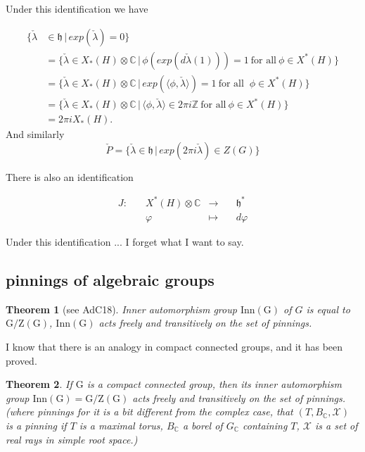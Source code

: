 \documentclass[12pt]{amsart}
\numberwithin{equation}{section}
\newtheorem{thm}{Theorem}[section]
\newcommand{\BC}{{\mathbb {C}}}
\newcommand{\BZ}{{\mathbb {Z}}}
\newcommand{\RG}{{\mathrm {G}}}
\newcommand{\fh}{\mathfrak{h}}
\newcommand{\set}[2]{\{#1\,|\,#2\}}
\newcommand{\defmap}[5]{
           \begin{equation*}
              \begin{aligned}
                   #1:\quad  & #2 &\longrightarrow &\quad #3 \\
                      \quad  & #4    &\longmapsto  &\quad #5
              \end{aligned}
           \end{equation*}
          }
\begin{document}
Under this identification we have

\begin{align*}
  \set{\check{\lambda} & \in \fh}{exp(\check{\lambda})=0}                                                                                                        \\
                       & = \set{\check{\lambda} \in X_*(H)\otimes \BC}{\phi(exp(d \check{\lambda}(1))) = 1 \ \textrm{for all} \ \phi \in X^*(H)}                 \\
                       & = \set{\check{\lambda} \in X_*(H)\otimes \BC}{exp(\langle\phi,\check{\lambda} \rangle) = 1 \ \textrm{for all } \ \phi \in X^*(H)}       \\
                       & = \set{\check{\lambda} \in X_*(H)\otimes \BC}{\langle\phi,\check{\lambda} \rangle \in 2 \pi i \BZ \ \textrm{for all} \ \phi \in X^*(H)} \\
                       & = 2 \pi i X_*(H).
\end{align*}
And similarly
$$\check{P} = \set{\check{\lambda} \in \fh}{exp(2 \pi i \check{\lambda}) \in Z(G)} $$


There is also an identification
\defmap{J}{X^*(H)\otimes \BC}{\fh ^*}{\varphi}{d \varphi}

Under this identification ...  I forget what I want to say.

\subsection{pinnings of algebraic groups}

\begin{thm}[see AdC18]
  Inner automorphism group $\mathrm{Inn(G)}$ of $G$ is equal to $\mathrm{G/Z(G)}$,
  $\mathrm{Inn(G)}$ acts freely and transitively on the set of pinnings.
\end{thm}


I know that there is an analogy in compact connected groups, and it has been proved.

\begin{thm}
  If $\RG$ is a compact connected group, then its inner automorphism group $\mathrm{Inn(G)} = \mathrm{G/Z(G)}$
  acts freely and transitively on the set of pinnings.
  (where pinnings for it is a bit different from the complex case, that $(T, B_\BC,\mathcal{X})$
  is a pinning if $T$ is a maximal torus, $B_\BC$ a borel of $G_\BC$ containing $T$, $\mathcal{X}$
  is a set of real rays in simple root space.)
\end{thm}
\end{document}
